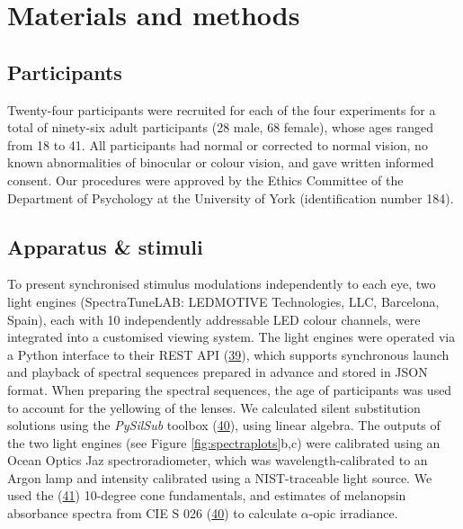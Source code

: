 \documentclass[
]{article}
\begin{document}
\hypertarget{materials-and-methods}{%
\section{Materials and methods}\label{materials-and-methods}}

\hypertarget{participants}{%
\subsection{Participants}\label{participants}}

Twenty-four participants were recruited for each of the four experiments for a total of ninety-six adult participants (28 male, 68 female), whose ages ranged from 18 to 41. All participants had normal or corrected to normal vision, no known abnormalities of binocular or colour vision, and gave written informed consent. Our procedures were approved by the Ethics Committee of the Department of Psychology at the University of York (identification number 184).

\hypertarget{apparatus-stimuli}{%
\subsection{Apparatus \& stimuli}\label{apparatus-stimuli}}

To present synchronised stimulus modulations independently to each eye, two light engines (SpectraTuneLAB: LEDMOTIVE Technologies, LLC, Barcelona, Spain), each with 10 independently addressable LED colour channels, were integrated into a customised viewing system. The light engines were operated via a Python interface to their REST API (\protect\hyperlink{ref-Martin2022}{39}), which supports synchronous launch and playback of spectral sequences prepared in advance and stored in JSON format. When preparing the spectral sequences, the age of participants was used to account for the yellowing of the lenses. We calculated silent substitution solutions using the \emph{PySilSub} toolbox (\protect\hyperlink{ref-Martin2023}{40}), using linear algebra. The outputs of the two light engines (see Figure \ref{fig:spectraplots}b,c) were calibrated using an Ocean Optics Jaz spectroradiometer, which was wavelength-calibrated to an Argon lamp and intensity calibrated using a NIST-traceable light source. We used the (\protect\hyperlink{ref-Stockman2000}{41}) 10-degree cone fundamentals, and estimates of melanopsin absorbance spectra from CIE S 026 (\protect\hyperlink{ref-Martin2023}{40}) to calculate \(\alpha\)-opic irradiance.
\end{document}
